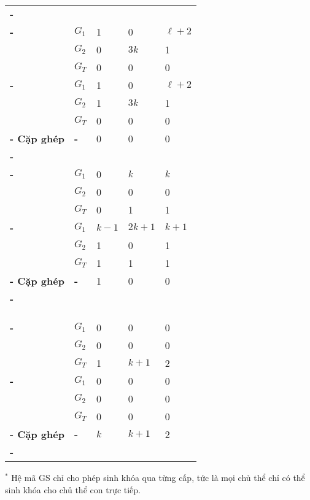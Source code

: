 \begin{longtabu}{| >{\bfseries\centering}p{2.5cm} | >{\bfseries\centering}p{1cm} | X[c] X[c] X[c] |}
	\tabucline[2pt]-
	 \\
	\tabucline[1pt]-
	& $G_1$ 			& 	1 	& 	0 		& 	$\ell + 2$ 	\\
	& $G_2$ 			& 	0 	& 	$3k$ 	& 	1 			\\
	& $G_T$ 			& 	0 	& 	0 		& 	0 			\\
	\tabucline[1pt]-
	& $G_1$ 			& 	1 	& 	0 		& 	$\ell + 2$ 	\\
	& $G_2$ 			& 	1 	& 	$3k$ 	& 	1 			\\
	& $G_T$ 			& 	0 	& 	0 		& 	0 			\\
	\tabucline[1pt]-
	Cặp ghép & - 		& 	0 	& 	0 		& 	0 			\\
	\tabucline[2pt]-
	 \\
	\tabucline[1pt]-
	& $G_1$ 			& 	0 			& 	$k$ 		& 	$k$ 		\\
	& $G_2$ 			& 	0 			& 	0 			& 	0 			\\
	& $G_T$ 			& 	0 			& 	1 			& 	1 			\\
	\tabucline[1pt]-
	& $G_1$ 			& 	$k - 1$ 	& 	$2k + 1$ 	& 	$k + 1$ 	\\
	& $G_2$ 			& 	1 			& 	0 			& 	1 			\\
	& $G_T$ 			& 	1 			& 	1 			& 	1 			\\
	\tabucline[1pt]-
	Cặp ghép & - 		& 	1 			& 	0 			& 	0 			\\
	\tabucline[2pt]-
	 \\
	 \\
	 \\
	 \\
	\tabucline[1pt]-
	& $G_1$ 			& 	0 		& 	0 			& 	0 	\\
	& $G_2$ 			& 	0 		& 	0 			& 	0 	\\
	& $G_T$ 			& 	1 		& 	$k + 1$ 	& 	2 	\\
	\tabucline[1pt]-
	& $G_1$ 			& 	0 		& 	0 			& 	0 	\\
	& $G_2$ 			& 	0 		& 	0 			& 	0 	\\
	& $G_T$ 			& 	0 		& 	0 			& 	0 	\\
	\tabucline[1pt]-
	Cặp ghép & - 		& 	$k$ 	& 	$k + 1$ 	& 	2 	\\
	\tabucline[3pt]-
\end{longtabu}
$^*$ Hệ mã GS chỉ cho phép sinh khóa qua từng cấp, tức là mọi chủ thể chỉ có thể sinh khóa cho chủ thể con trực tiếp.